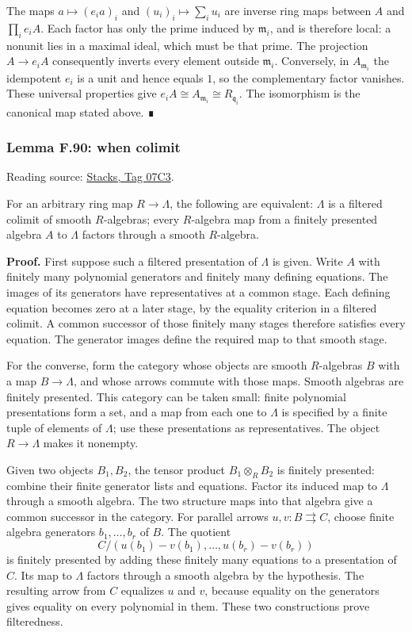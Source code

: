 \documentclass[11pt,a4paper,openany]{report}
\newcounter{none}
\begin{document}
The maps \(a\mapsto(e_i a)_i\) and \((u_i)_i\mapsto\sum_i u_i\) are inverse ring maps between \(A\) and \(\prod_i e_iA\). Each factor has only the prime induced by \(\mathfrak m_i\), and is therefore local: a nonunit lies in a maximal ideal, which must be that prime. The projection \(A\to e_iA\) consequently inverts every element outside \(\mathfrak m_i\). Conversely, in \(A_{\mathfrak m_i}\) the idempotent \(e_i\) is a unit and hence equals \(1\), so the complementary factor vanishes. These universal properties give \(e_iA\cong A_{\mathfrak m_i}\cong R_{\mathfrak q_i}\). The isomorphism is the canonical map stated above. ∎

\label{AG-RG-S05-algebra-lemma-when-colimit}

\subsubsection{Lemma F.90: when colimit}\label{AG-RG-S05-lemma-f.90-when-colimit}

Reading source: \href{https://stacks.math.columbia.edu/tag/07C3}{Stacks, Tag 07C3}.

For an arbitrary ring map \(R\to\Lambda\), the following are equivalent: \(\Lambda\) is a filtered colimit of smooth \(R\)-algebras; every \(R\)-algebra map from a finitely presented algebra \(A\) to \(\Lambda\) factors through a smooth \(R\)-algebra.

\textbf{Proof.} First suppose such a filtered presentation of \(\Lambda\) is given. Write \(A\) with finitely many polynomial generators and finitely many defining equations. The images of its generators have representatives at a common stage. Each defining equation becomes zero at a later stage, by the equality criterion in a filtered colimit. A common successor of those finitely many stages therefore satisfies every equation. The generator images define the required map to that smooth stage.

For the converse, form the category whose objects are smooth \(R\)-algebras \(B\) with a map \(B\to\Lambda\), and whose arrows commute with those maps. Smooth algebras are finitely presented. This category can be taken small: finite polynomial presentations form a set, and a map from each one to \(\Lambda\) is specified by a finite tuple of elements of \(\Lambda\); use these presentations as representatives. The object \(R\to\Lambda\) makes it nonempty.

Given two objects \(B_1,B_2\), the tensor product \(B_1\otimes_R B_2\) is finitely presented: combine their finite generator lists and equations. Factor its induced map to \(\Lambda\) through a smooth algebra. The two structure maps into that algebra give a common successor in the category. For parallel arrows \(u,v\colon B\rightrightarrows C\), choose finite algebra generators \(b_1,\ldots,b_r\) of \(B\). The quotient \[
C/(u(b_1)-v(b_1),\ldots,u(b_r)-v(b_r))
\] is finitely presented by adding these finitely many equations to a presentation of \(C\). Its map to \(\Lambda\) factors through a smooth algebra by the hypothesis. The resulting arrow from \(C\) equalizes \(u\) and \(v\), because equality on the generators gives equality on every polynomial in them. These two constructions prove filteredness.
\end{document}
